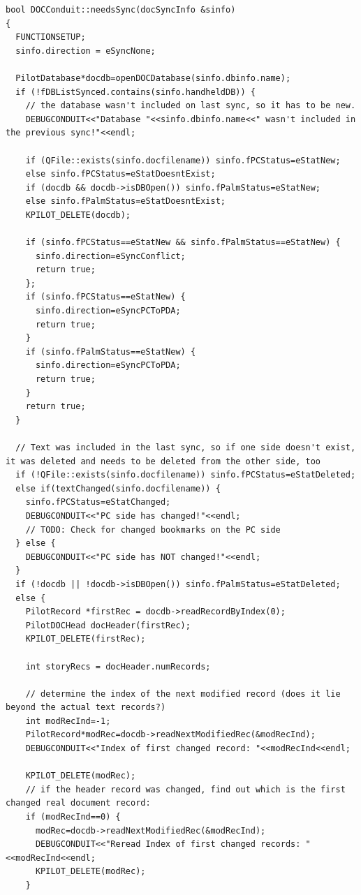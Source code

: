 \documentclass[10pt,a4paper]{article}
\begin{document}
{\footnotesize
\begin{verbatim}
bool DOCConduit::needsSync(docSyncInfo &sinfo)
{
  FUNCTIONSETUP;
  sinfo.direction = eSyncNone;
  
  PilotDatabase*docdb=openDOCDatabase(sinfo.dbinfo.name);
  if (!fDBListSynced.contains(sinfo.handheldDB)) {
    // the database wasn't included on last sync, so it has to be new.
    DEBUGCONDUIT<<"Database "<<sinfo.dbinfo.name<<" wasn't included in the previous sync!"<<endl;

    if (QFile::exists(sinfo.docfilename)) sinfo.fPCStatus=eStatNew;
    else sinfo.fPCStatus=eStatDoesntExist;
    if (docdb && docdb->isDBOpen()) sinfo.fPalmStatus=eStatNew;
    else sinfo.fPalmStatus=eStatDoesntExist;
    KPILOT_DELETE(docdb);
    
    if (sinfo.fPCStatus==eStatNew && sinfo.fPalmStatus==eStatNew) {
      sinfo.direction=eSyncConflict;
      return true;
    };
    if (sinfo.fPCStatus==eStatNew) {
      sinfo.direction=eSyncPCToPDA;
      return true;
    }
    if (sinfo.fPalmStatus==eStatNew) {
      sinfo.direction=eSyncPCToPDA;
      return true;
    }
    return true;
  }
  
  // Text was included in the last sync, so if one side doesn't exist, it was deleted and needs to be deleted from the other side, too
  if (!QFile::exists(sinfo.docfilename)) sinfo.fPCStatus=eStatDeleted;
  else if(textChanged(sinfo.docfilename)) {
    sinfo.fPCStatus=eStatChanged;
    DEBUGCONDUIT<<"PC side has changed!"<<endl;
    // TODO: Check for changed bookmarks on the PC side
  } else {
    DEBUGCONDUIT<<"PC side has NOT changed!"<<endl;
  }
  if (!docdb || !docdb->isDBOpen()) sinfo.fPalmStatus=eStatDeleted;
  else {
    PilotRecord *firstRec = docdb->readRecordByIndex(0);
    PilotDOCHead docHeader(firstRec);
    KPILOT_DELETE(firstRec);

    int storyRecs = docHeader.numRecords;

    // determine the index of the next modified record (does it lie beyond the actual text records?)
    int modRecInd=-1;
    PilotRecord*modRec=docdb->readNextModifiedRec(&modRecInd);
    DEBUGCONDUIT<<"Index of first changed record: "<<modRecInd<<endl;
    
    KPILOT_DELETE(modRec);
    // if the header record was changed, find out which is the first changed real document record:
    if (modRecInd==0) {
      modRec=docdb->readNextModifiedRec(&modRecInd);
      DEBUGCONDUIT<<"Reread Index of first changed records: "<<modRecInd<<endl;
      KPILOT_DELETE(modRec);
    }
  

\end{verbatim}}
\end{document}

